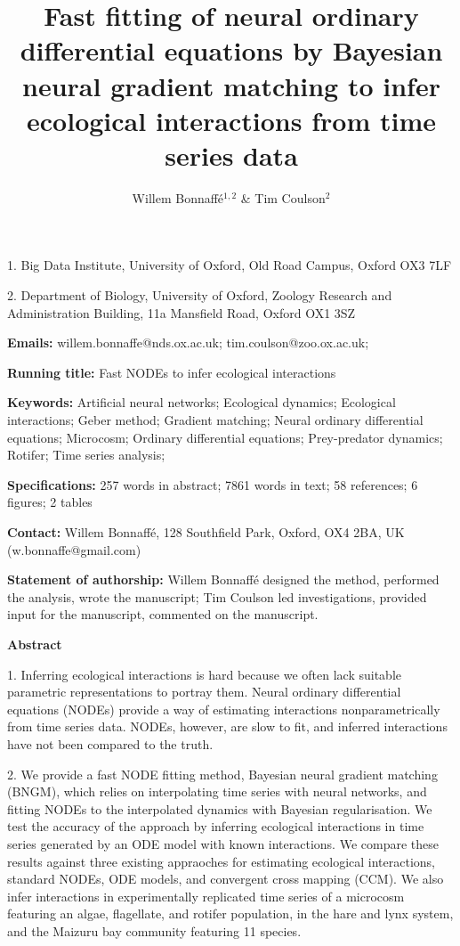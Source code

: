 \documentclass[11pt, oneside]{article}
\title{Fast fitting of neural ordinary differential equations by Bayesian neural gradient matching to infer ecological interactions from time series data}
\author{Willem Bonnaff\'e$^{1,2}$ \& Tim Coulson$^2$}
\date{}
\begin{document}
\maketitle
{}

1. Big Data Institute, University of Oxford, Old Road Campus, Oxford OX3 7LF 

2. Department of Biology, University of Oxford, Zoology Research and Administration Building, 11a Mansfield Road, Oxford OX1 3SZ 

\textbf{Emails:}
willem.bonnaffe@nds.ox.ac.uk;
tim.coulson@zoo.ox.ac.uk;

\textbf{Running title:}
Fast NODEs to infer ecological interactions

\textbf{Keywords:}
Artificial neural networks;
Ecological dynamics;  
Ecological interactions;
Geber method; 
Gradient matching;
Neural ordinary differential equations; 
Microcosm;
Ordinary differential equations; 
Prey-predator dynamics; 
Rotifer;
Time series analysis;

\textbf{Specifications:}  257 words in abstract; 7861 words in text; 58 references; 6 figures; 2 tables

\textbf{Contact:}
Willem Bonnaff\'e, 128 Southfield Park, Oxford, OX4 2BA, UK (w.bonnaffe@gmail.com)

\textbf{Statement of authorship:}
Willem Bonnaff\'e designed the method, performed the analysis, wrote the manuscript; 
Tim Coulson led investigations, provided input for the manuscript, commented on the manuscript.

\newpage
{}

\textbf{Abstract} 

1. Inferring ecological interactions is hard because we often lack suitable parametric representations to portray them.
Neural ordinary differential equations (NODEs) provide a way of estimating interactions nonparametrically from time series data. 
NODEs, however, are slow to fit, and inferred interactions have not been compared to the truth.

2. We provide a fast NODE fitting method, Bayesian neural gradient matching (BNGM), which relies on interpolating time series with neural networks, and fitting NODEs to the interpolated dynamics with Bayesian regularisation.
We test the accuracy of the approach by inferring ecological interactions in time series generated by an ODE model with known interactions. 
We compare these results against three existing appraoches for estimating ecological interactions, standard NODEs, ODE models, and convergent cross mapping (CCM).
We also infer interactions in experimentally replicated time series of a microcosm featuring an algae, flagellate, and rotifer population, in the hare and lynx system, and the Maizuru bay community featuring 11 species.
\end{document}
